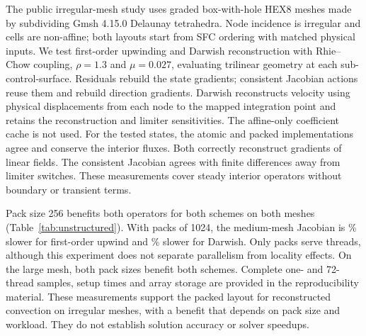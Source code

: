 \documentclass[sigconf,nonacm]{acmart}
\begin{document}
The public irregular-mesh study uses graded box-with-hole HEX8 meshes made by
subdividing Gmsh 4.15.0 Delaunay tetrahedra. Node incidence is irregular and
cells are non-affine; both layouts start from SFC ordering with matched physical
inputs. We test first-order upwinding and Darwish reconstruction with
Rhie--Chow coupling, $\rho=1.3$ and $\mu=0.027$, evaluating trilinear
geometry at each sub-control-surface. Residuals rebuild the state gradients;
consistent Jacobian actions reuse them and rebuild direction gradients.
Darwish reconstructs velocity using physical displacements from each node to
the mapped integration point and retains the reconstruction and limiter
sensitivities. The affine-only coefficient cache is not used.
For the tested states, the atomic and packed implementations agree and conserve
the interior fluxes. Both correctly reconstruct gradients of linear fields.
The consistent Jacobian agrees with finite differences away from limiter switches.
These measurements cover steady interior operators without boundary or transient terms.

\begin{table}[t]
  \centering\small
  \setlength{\tabcolsep}{3pt}
  \caption{Irregular-mesh FP64 operators on \unstrThreads{} Grace cores.
    M/L: \num{\unstrMediumCells}/\num{\unstrLargeCells} cells.
    Ratios are mean atomic/packed times; brackets span all \unstrBlocks{}
    paired ratios, not confidence intervals. Each implementation uses \unstrWarmup{}
    warmups and \unstrRepeat{} timed applications per sample. The schemes
    use the same code version in separate runs; each atomic/packed pair
    is measured within the same run. Both Jacobian actions are consistent.}
  \label{tab:unstructured}
  
\end{table}

Pack size 256 benefits both operators for both schemes on both meshes
(Table~\ref{tab:unstructured}). With packs of 1024, the medium-mesh
Jacobian is \unstrFirstMediumBigSlowdown{}\% slower for first-order upwind
and \unstrDarwishMediumBigSlowdown{}\% slower for Darwish. Only
\unstrMediumBigPacks{} packs serve \unstrThreads{} threads, although this
experiment does not separate parallelism from locality effects. On the large
mesh, both pack sizes benefit both schemes. Complete one- and 72-thread samples,
setup times and array storage are provided in the reproducibility material.
These measurements support the packed layout for reconstructed convection on
irregular meshes, with a benefit that depends on pack size and workload.
They do not establish solution accuracy or solver speedups.
\end{document}
